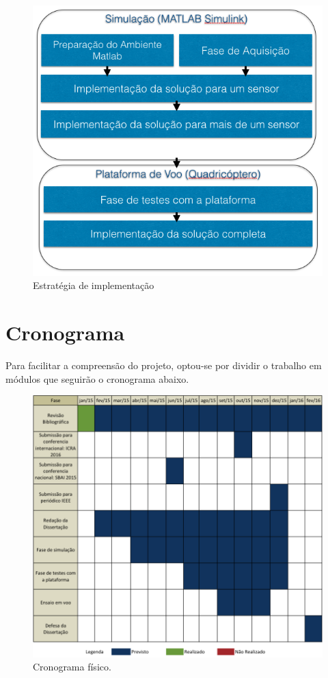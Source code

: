 \documentclass[a4paper, 12pt]{article}
\begin{document}
\begin{figure}[h]
	\centering
	\includegraphics[scale=0.5]{img/fluxo.png}
	\caption{Estratégia de implementação}
	\label{fig:Fluxo}
\end{figure}

\newpage


\section{Cronograma} 
\label{sec:crono}
Para facilitar a compreensão do projeto, optou-se por dividir o trabalho em módulos que seguirão o cronograma abaixo.
\begin{figure}[h]
	\centering
		\includegraphics[scale=0.4]{img/cronograma.png}
	\caption{Cronograma físico.}
	\label{fig:cronograma}
\end{figure}
\end{document}
